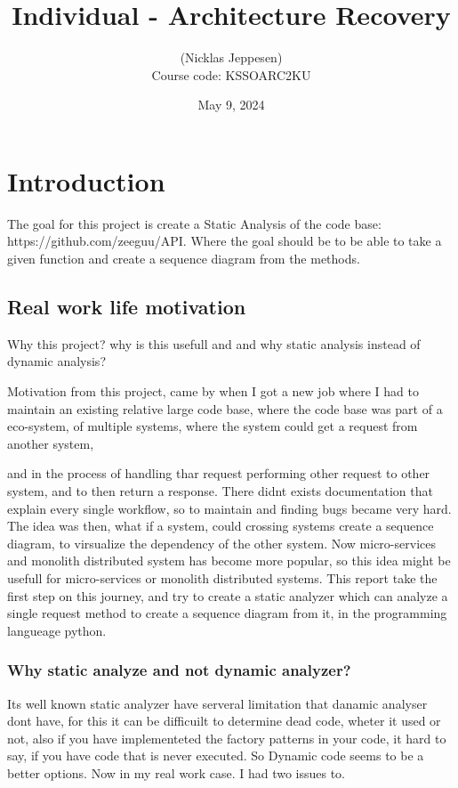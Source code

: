 \documentclass[12pt,a4paper]{report}
\title{Individual - Architecture Recovery}
\author{ (Nicklas Jeppesen) \\ Course code: KSSOARC2KU}
\date{May 9, 2024}
\begin{document}
	\maketitle
    \tableofcontents

    
    
    \chapter{Introduction}
    The goal for this project is create a Static Analysis of the code base: https://github.com/zeeguu/API. 
    Where the goal should be to be able to take a given function and create a sequence diagram from the methods. 


    \section{Real work life motivation}
    Why this project? why is this usefull and and why static analysis instead of dynamic analysis? 
    
    Motivation from this project, came by when I got a new job where I had to maintain an existing relative large code base, where the code base was part of a eco-system, of multiple systems, where the system could get a request from another system, 
    
    and in the process of handling thar request performing other request to other system, and to then return a response. There didnt exists documentation that explain every single workflow, so to maintain and finding bugs became very hard. The idea was then, what if a system, could crossing systems create a sequence diagram, to virsualize the dependency of the other system. Now micro-services and monolith distributed system has become more popular, so this idea might be usefull for micro-services or monolith distributed systems. 
    This report take the first step on this journey, and try to create a static analyzer which can analyze a single request method to create a sequence diagram from it, in the programming langueage python.

    \subsection*{Why static analyze and not dynamic analyzer?}
    Its well known static analyzer have serveral limitation that danamic analyser dont have, for this it can be difficuilt to determine dead code, wheter it used or not, also if you have implementeted the factory patterns in your code, it hard to say, if you have code that is never executed. So Dynamic code seems to be a better options. Now in my real work case. I had two issues to. 
\end{document}
